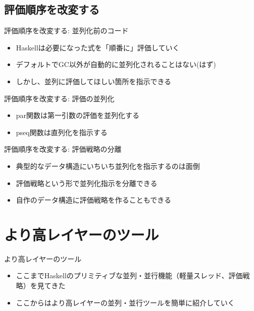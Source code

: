\documentclass[unicode,12pt]{beamer}
\begin{document}
\subsection{評価順序を改変する}

\begin{frame}{評価順序を改変する: 並列化前のコード}
  \begin{itemize}
  \item Haskellは必要になった式を「順番に」評価していく
  \item デフォルトでGC以外が自動的に並列化されることはない(はず)
  \item しかし、\alert{並列に評価してほしい箇所を指示}できる
  \end{itemize}
  
\end{frame}

\begin{frame}{評価順序を改変する: 評価の並列化}
  \begin{itemize}
    \item {\ttfamily par}関数は第一引数の評価を並列化する
    \item {\ttfamily pseq}関数は直列化を指示する
  \end{itemize}
  
\end{frame}

\begin{frame}{評価順序を改変する: 評価戦略の分離}
  \begin{itemize}
    \item 典型的なデータ構造にいちいち並列化を指示するのは面倒
    \item \alert{評価戦略}という形で並列化指示を分離できる
    \item 自作のデータ構造に評価戦略を作ることもできる
    \end{itemize}
  
\end{frame}

\section{より高レイヤーのツール}

\begin{frame}{より高レイヤーのツール}
  \begin{itemize}
    \item ここまでHaskellのプリミティブな並列・並行機能（軽量スレッド、評価戦略）を見てきた
    \item ここからはより高レイヤーの並列・並行ツールを簡単に紹介していく
  \end{itemize}
\end{frame}
\end{document}
